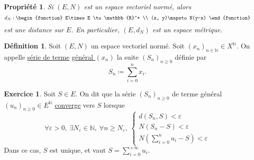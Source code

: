\documentclass{report}
\newcommand{\Nepsilon}{N_\varepsilon}
\newcommand{\reels}{\mathbb{R}}
\newcommand{\naturals}{\mathbb{N}}
\theoremstyle{definition}
\newtheorem{definition}{Définition}
\newtheorem*{exercice}{Exercice}
\theoremstyle{plain}
\newtheorem{property}{Propriété}
\theoremstyle{remark}
\begin{document}
\begin{leftbar}
    \begin{property}
        Si $(E, N)$ est un espace vectoriel normé, alors
        \begin{equation*}
            d_N : \begin{function}
            E\times E \to\reels^+ \\ 
            (x, y)\mapsto N(y-x)
            \end{function} 
        \end{equation*}
        est une distance sur $E$. En
        particulier, $(E, d_N)$ est un espace métrique.
    \end{property}
\end{leftbar}

\begin{leftbar}
    \begin{definition}
        Soit $(E, N)$ un espace vectoriel normé. Soit 
        $(x_n)_{n\in\naturals} \in X^\naturals$. On appelle \underline{série
        de terme} \underline{général $(x_n)$} la suite $(S_n)_{n\ge0}$ définie
        par
        \begin{equation*}
           S_n \coloneqq\sum\limits_{i=0}^{n} x_i.
        \end{equation*}
        
    \end{definition}
\end{leftbar}

\begin{exercice}
    Soit $S \in E$. On dit que la série $(S_n)_{n\ge0}$ de terme général
    $(u_n)_{n\ge0} \in E^\naturals$ \underline{converge} vers $S$ lorsque
    \begin{equation*}
        \forall\varepsilon > 0,\ \exists\Nepsilon\in\naturals,\ \forall n\ge
        \Nepsilon,\ \begin{cases}
            d(S_n, S) < \varepsilon \\
            N(S_n - S) < \varepsilon \\
            N(\sum\limits_{i=0}^n u_i - S) < \varepsilon
        \end{cases}
    \end{equation*}
    Dans ce cas, $S$ est unique, et vaut $ S = \sum\limits_{i=0}^{+\infty}
    u_i$.
\end{exercice}
\end{document}
